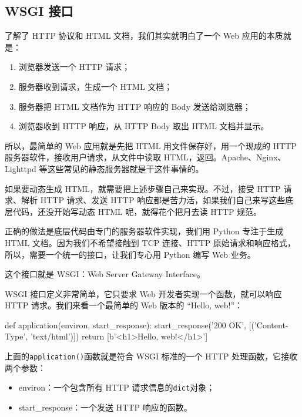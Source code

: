 \hypertarget{wsgi-ux63a5ux53e3}{%
\subsection{WSGI 接口}\label{wsgi-ux63a5ux53e3}}

了解了 HTTP 协议和 HTML 文档，我们其实就明白了一个 Web 应用的本质就是：

\begin{enumerate}
\def\labelenumi{\arabic{enumi}.}
\item
  浏览器发送一个 HTTP 请求；
\item
  服务器收到请求，生成一个 HTML 文档；
\item
  服务器把 HTML 文档作为 HTTP 响应的 Body 发送给浏览器；
\item
  浏览器收到 HTTP 响应，从 HTTP Body 取出 HTML 文档并显示。
\end{enumerate}

所以，最简单的 Web 应用就是先把 HTML 用文件保存好，用一个现成的 HTTP
服务器软件，接收用户请求，从文件中读取
HTML，返回。Apache、Nginx、Lighttpd
等这些常见的静态服务器就是干这件事情的。

如果要动态生成 HTML，就需要把上述步骤自己来实现。不过，接受 HTTP
请求、解析 HTTP 请求、发送 HTTP
响应都是苦力活，如果我们自己来写这些底层代码，还没开始写动态 HTML
呢，就得花个把月去读 HTTP 规范。

正确的做法是底层代码由专门的服务器软件实现，我们用 Python 专注于生成
HTML 文档。因为我们不希望接触到 TCP 连接、HTTP
原始请求和响应格式，所以，需要一个统一的接口，让我们专心用 Python 编写
Web 业务。

这个接口就是 WSGI：Web Server Gateway Interface。

WSGI 接口定义非常简单，它只要求 Web 开发者实现一个函数，就可以响应 HTTP
请求。我们来看一个最简单的 Web 版本的 ``Hello, web!''：

\begin{pythoncode}
def application(environ, start_response):
    start_response('200 OK', [('Content-Type', 'text/html')])
    return [b'<h1>Hello, web!</h1>']
\end{pythoncode}

上面的\texttt{application()}函数就是符合 WSGI 标准的一个 HTTP
处理函数，它接收两个参数：

\begin{itemize}
\item
  environ：一个包含所有 HTTP 请求信息的\texttt{dict}对象；
\item
  start\_response：一个发送 HTTP 响应的函数。
\end{itemize}

